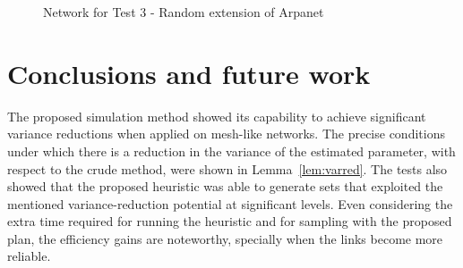 \documentclass[a4paper]{article}
\begin{document}
\begin{figure}[h!]
{}\caption{Network for Test 3 - Random extension of Arpanet}\label{fig:arpanetRandomExt}
\end{figure}
 


\section{Conclusions and future work}\label{s:conclusions}

The proposed simulation method showed its capability to achieve significant variance reductions when applied on mesh-like networks. The precise conditions under which there is a reduction in the variance of the estimated parameter, with respect to the crude method, were shown in  Lemma~\ref{lem:varred}. The tests also showed that the proposed heuristic was able to generate sets that exploited the mentioned variance-reduction potential at significant levels. Even considering the extra time required for running the heuristic and for sampling with the proposed plan, the efficiency gains are noteworthy, specially when the links become more reliable.
\end{document}
